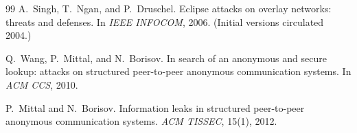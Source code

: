 \documentclass[11pt]{article}
\begin{document}
\begin{thebibliography}{99}
A.~Singh, T.~Ngan, and P.~Druschel.
\newblock Eclipse attacks on overlay networks: threats and defenses.
\newblock In \emph{IEEE INFOCOM}, 2006. (Initial versions circulated 2004.)

Q.~Wang, P.~Mittal, and N.~Borisov.
\newblock In search of an anonymous and secure lookup: attacks on structured peer-to-peer anonymous communication systems.
\newblock In \emph{ACM CCS}, 2010.

P.~Mittal and N.~Borisov.
\newblock Information leaks in structured peer-to-peer anonymous communication systems.
\newblock \emph{ACM TISSEC}, 15(1), 2012.
\end{thebibliography}
\end{document}
